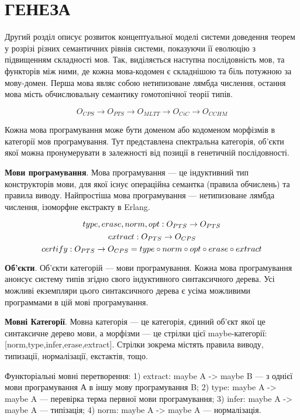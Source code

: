 
\chapter{ГЕНЕЗА}

Другий розділ описує розвиток концептуальної моделі системи доведення теорем
у розрізі різних семантичних рівнів системи, показуючи її еволюцію з
підвищенням складності мов. Так, виділяється наступна послідовність мов, та функторів між ними,
де кожна мова-кодомен є складнішою та біль потужною за мову-домен. Перша мова
являє собою нетипизоване лямбда числення, остання мова
мість обчислювальну семантику гомотопічної теорії типів.

$$
O_{CPS} \rightarrow O_{PTS} \rightarrow O_{MLTT} \rightarrow O_{CiC} \rightarrow O_{CCHM}
$$

Кожна мова програмування може бути доменом або кодоменом
морфізмів в категорії мов програмування. Тут представлена спектральна категорія,
об'єкти якої можна пронумерувати в залежності від позиції в генетичній послідовності.

{\bf Мови програмування}. Мова програмування --- це індуктивний тип конструкторів мови,
для якої існує операційна семантка (правила обчислень) та правила виводу.
Найпростіша мова програмування --- нетипизоване лямбда числення,
ізоморфне екстракту в Erlang.

$$
type,erase,norm,opt: O_{PTS} \rightarrow O_{PTS} \\
$$
$$
extract: O_{PTS} \rightarrow O_{CPS} \\
$$
$$
certify: O_{PTS} \rightarrow O_{CPS} = type \circ norm \circ opt \circ erase \circ extract \\
$$


{\bf Об'єкти}. Об'єкти категорій --- мови програмування. Кожна мова програмування
анонсує систему типів згідно свого індуктивного синтаксичного дерева.
Усі можливі екземпляри цього синтаксичного дерева є усіма
можливими программами в цій мові програмування.

{\bf Мовні Категорії}. Мовна категорія --- це категорія, єдиний об’єкт якої це
синтаксичне дерево мови, а морфізми --- це стрілки
цієї maybe-категорії: [norm,type,infer,erase,extract]. Стрілки
зокрема містять правила виводу, типизації, нормалізації, екстактів, тощо.

Функторіальні мовні перетворення: 1) extract: maybe A -> maybe B --- з однієї
мови програмування А в іншу мову програмування B; 2) type: maybe A -> maybe A
--- перевірка терма первної мови програмування; 3) infer: maybe A -> maybe A
--- типізація; 4) norm: maybe A -> maybe A --- нормалізація.

